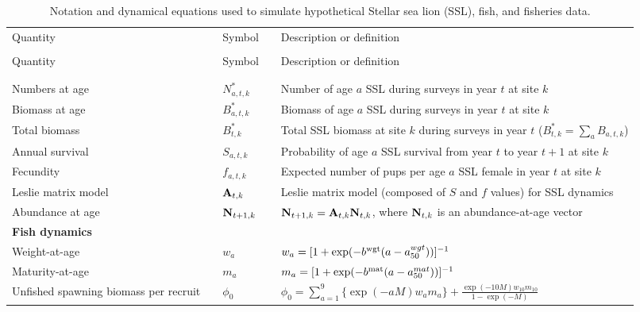 \documentclass[nonumbib,leqno]{nrc1}
\begin{document}
\begin{longtable}{p{4cm}lll p{8cm}}
\caption[Population \& Fisheries dynamics]{\large Notation and dynamical equations used to simulate
 hypothetical Stellar sea lion (SSL), fish, and fisheries data.} \label{tab:model} \\
\hline \hline 
Quantity & & Symbol & & Description or definition \\
\cline{1-1} \cline{3-3} \cline{5-5} \\
\endfirsthead
\hline \hline
Quantity & & Symbol & & Description or definition \\
\cline{1-1} \cline{3-3} \cline{5-5} \\
\endhead
\hline
\endfoot
\hline
\endlastfoot
\multicolumn{1}{l}{\textbf{Stellar sea lion dynamics}}\\
Numbers at age & & $N_{a,t,k}^*$ & & Number of age $a$ SSL during surveys in year $t$ at site $k$\\
Biomass at age & & $B_{a,t,k}^*$ & & Biomass of age $a$ SSL during surveys in year $t$ at site $k$\\
Total biomass & & $B_{t,k}^*$ & & Total SSL biomass at site $k$ during surveys in year $t$ ($B_{t,k}^*=\sum_a B_{a,t,k}$) \\
Annual survival & & $S_{a,t,k}$ & & Probability of age $a$ SSL survival from year $t$ to year $t+1$ at site $k$ \\
Fecundity & & $f_{a,t,k}$ & & Expected number of pups per age $a$ SSL female in year $t$ at site $k$ \\
Leslie matrix model & & ${\bf A}_{t,k}$ & & Leslie matrix model (composed of $S$ and $f$ values) for SSL dynamics \\
Abundance at age & & ${\bf N}_{t+1,k}$ & & ${\bf N}_{t+1,k}={\bf A}_{t,k} {\bf N}_{t,k}$, where \newline ${\bf N}_{t,k}$ is an abundance-at-age vector \\
\midrule
\multicolumn{1}{l}{\textbf{Fish dynamics}}\\
Weight-at-age & & $w_a$ & & $w_a = [ 1 + \exp(-b^{\rm wgt}(a-a_{50}^{wgt})) ]^{-1}$ \\
Maturity-at-age & & $m_a$ & & $m_a = [ 1 + \exp(-b^{\rm mat}(a-a_{50}^{mat})) ]^{-1}$ \\
Unfished spawning biomass per recruit & & $\phi_0$ & & $\phi_0=\sum_{a=1}^9 \{ \exp(-aM) w_a m_a \} + \frac{\exp(-10M) w_{10} m_{10}}{1-\exp(-M)}$ \\


\end{longtable}
\end{document}

